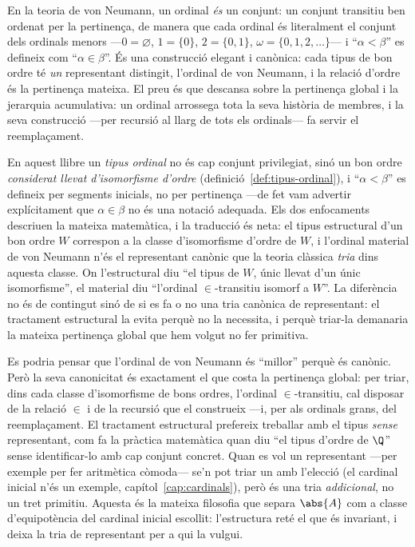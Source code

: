 En la teoria de von Neumann, un ordinal \emph{és} un conjunt: un conjunt
transitiu ben ordenat per la pertinença, de manera que cada ordinal és
literalment el conjunt dels ordinals menors ---\(0=\varnothing\),
\(1=\{0\}\), \(2=\{0,1\}\), \(\omega=\{0,1,2,\dots\}\)--- i
\enquote{\(\alpha<\beta\)} es defineix com \enquote{\(\alpha\in\beta\)}. És
una construcció elegant i canònica: cada tipus de bon ordre té \emph{un}
representant distingit, l'ordinal de von Neumann, i la relació d'ordre és la
pertinença mateixa. El preu és que descansa sobre la pertinença global i la
jerarquia acumulativa: un ordinal arrossega tota la seva història de
membres, i la seva construcció ---per recursió al llarg de tots els
ordinals--- fa servir el reemplaçament.

En aquest llibre un \emph{tipus ordinal} no és cap conjunt privilegiat, sinó
un bon ordre \emph{considerat llevat d'isomorfisme d'ordre}
(definició~\ref{def:tipus-ordinal}), i \enquote{\(\alpha<\beta\)} es defineix
per segments inicials, no per pertinença ---de fet vam advertir explícitament
que \(\alpha\in\beta\) no és una notació adequada. Els dos enfocaments
descriuen la mateixa matemàtica, i la traducció és neta: el tipus estructural
d'un bon ordre \(W\) correspon a la classe d'isomorfisme d'ordre de \(W\),
i l'ordinal material de von Neumann n'és el representant canònic que la teoria
clàssica \emph{tria} dins aquesta classe. On l'estructural diu \enquote{el
tipus de \(W\), únic llevat d'un únic isomorfisme}, el material diu
\enquote{l'ordinal \(\in\)-transitiu isomorf a \(W\)}. La diferència no és de
contingut sinó de si es fa o no una tria canònica de representant: el
tractament estructural la evita perquè no la necessita, i perquè triar-la
demanaria la mateixa pertinença global que hem volgut no fer primitiva.

\begin{observacio}\label{obs:vonneumann-representant}
Es podria pensar que l'ordinal de von Neumann és \enquote{millor} perquè és
canònic. Però la seva canonicitat és exactament el que costa la pertinença
global: per triar, dins cada classe d'isomorfisme de bons ordres, l'ordinal
\(\in\)-transitiu, cal disposar de la relació \(\in\) i de la recursió que el
construeix ---i, per als ordinals grans, del reemplaçament. El tractament
estructural prefereix treballar amb el tipus \emph{sense} representant, com fa
la pràctica matemàtica quan diu \enquote{el tipus d'ordre de \(\Q\)} sense
identificar-lo amb cap conjunt concret. Quan es vol un representant ---per
exemple per fer aritmètica còmoda--- se'n pot triar un amb l'elecció (el
cardinal inicial n'és un exemple, capítol~\ref{cap:cardinals}), però és una
tria \emph{addicional}, no un tret primitiu. Aquesta és la mateixa filosofia
que separa \(\abs{A}\) com a classe d'equipotència del cardinal inicial
escollit: l'estructura reté el que és invariant, i deixa la tria de
representant per a qui la vulgui.
\end{observacio}

